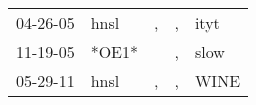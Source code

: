 \begin{supertabular}{lllll}
 04-26-05 &   hnsl &  , &  , &  ityt \\
 11-19-05 &  *OE1* &    &  , &  slow \\
 05-29-11 &   hnsl &  , &  , &  WINE \\
\end{supertabular}
